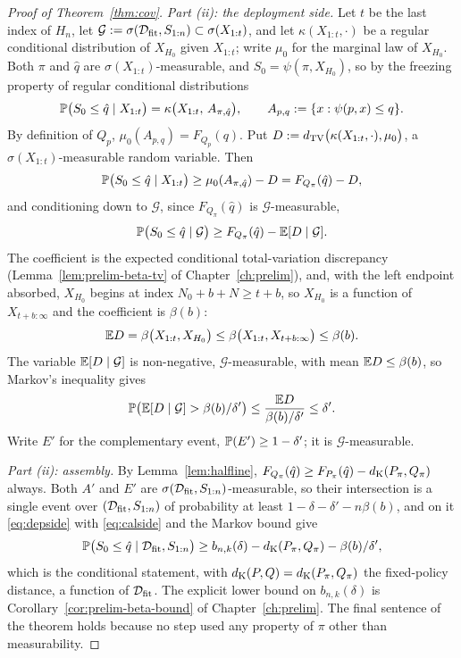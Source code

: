 \documentclass[../../../main.tex]{subfiles}
\begin{document}
\begin{proof}[Proof of Theorem~\ref{thm:cov}]
\emph{Part (ii): the deployment side.} Let $t$ be the last index of $H_n$, let $\mathcal G:=\sigma(\mathcal D_{\mathrm{fit}},S_{1:n})\subset\sigma(X_{1:t})$, and let $\kappa(X_{1:t},\cdot)$ be a regular conditional distribution of $X_{H_0}$ given $X_{1:t}$; write $\mu_0$ for the marginal law of $X_{H_0}$. Both $\pi$ and $\hat q$ are $\sigma(X_{1:t})$-measurable, and $S_0=\psi(\pi,X_{H_0})$, so by the freezing property of regular conditional distributions
\[
\mathbb{P}\big(S_0\le\hat q\mid X_{1:t}\big)=\kappa\big(X_{1:t},\,A_{\pi,\hat q}\big),\qquad A_{p,q}:=\{x:\psi(p,x)\le q\}.
\]
By definition of $Q_p$, $\mu_0(A_{p,q})=F_{Q_p}(q)$. Put $D:=d_{\mathrm{TV}}\big(\kappa(X_{1:t},\cdot),\mu_0\big)$, a $\sigma(X_{1:t})$-measurable random variable. Then
\[
\mathbb{P}\big(S_0\le\hat q\mid X_{1:t}\big)\ge\mu_0(A_{\pi,\hat q})-D=F_{Q_\pi}(\hat q)-D ,
\]
and conditioning down to $\mathcal G$, since $F_{Q_\pi}(\hat q)$ is $\mathcal G$-measurable,
\begin{equation}\label{eq:depside}
\mathbb{P}\big(S_0\le\hat q\mid\mathcal G\big)\ge F_{Q_\pi}(\hat q)-\mathbb{E}[D\mid\mathcal G].
\end{equation}
The coefficient is the expected conditional total-variation discrepancy (Lemma~\ref{lem:prelim-beta-tv} of Chapter~\ref{ch:prelim}), and, with the left endpoint absorbed, $X_{H_0}$ begins at index $N_0+b+N\ge t+b$, so $X_{H_0}$ is a function of $X_{t+b:\infty}$ and the coefficient is $\beta(b)$:
\[
\mathbb{E} D=\beta\big(X_{1:t},X_{H_0}\big)\le\beta\big(X_{1:t},X_{t+b:\infty}\big)\le\beta(b).
\]
The variable $\mathbb{E}[D\mid\mathcal G]$ is non-negative, $\mathcal G$-measurable, with mean $\mathbb{E} D\le\beta(b)$, so Markov's inequality gives
\[
\mathbb{P}\big(\mathbb{E}[D\mid\mathcal G]>\beta(b)/\delta'\big)\le\frac{\mathbb{E} D}{\beta(b)/\delta'}\le\delta' .
\]
Write $E'$ for the complementary event, $\mathbb{P}(E')\ge1-\delta'$; it is $\mathcal G$-measurable.

\emph{Part (ii): assembly.} By Lemma~\ref{lem:halfline}, $F_{Q_\pi}(\hat q)\ge F_{P_\pi}(\hat q)-d_{\mathrm{K}}(P_\pi,Q_\pi)$ always. Both $A'$ and $E'$ are $\sigma(\mathcal D_{\mathrm{fit}},S_{1:n})$-measurable, so their intersection is a single event over $(\mathcal D_{\mathrm{fit}},S_{1:n})$ of probability at least $1-\delta-\delta'-n\beta(b)$, and on it \eqref{eq:depside} with \eqref{eq:calside} and the Markov bound give
\[
\mathbb{P}\big(S_0\le\hat q\mid\mathcal D_{\mathrm{fit}},S_{1:n}\big)\ge b_{n,k}(\delta)-d_{\mathrm{K}}(P_\pi,Q_\pi)-\beta(b)/\delta',
\]
which is the conditional statement, with $d_{\mathrm{K}}(P,Q)=d_{\mathrm{K}}(P_\pi,Q_\pi)$ the fixed-policy distance, a function of $\mathcal D_{\mathrm{fit}}$. The explicit lower bound on $b_{n,k}(\delta)$ is Corollary~\ref{cor:prelim-beta-bound} of Chapter~\ref{ch:prelim}. The final sentence of the theorem holds because no step used any property of $\pi$ other than measurability.
\end{proof}
\end{document}
